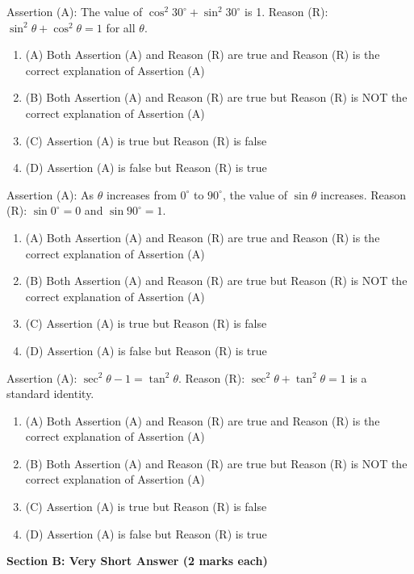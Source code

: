 \documentclass[12pt,a4paper]{exam}
\begin{document}
\begin{questions}
\question[1] Assertion (A): The value of $\cos^2 30^\circ + \sin^2 30^\circ$ is 1. Reason (R): $\sin^2 \theta + \cos^2 \theta = 1$ for all $\theta$.
\begin{enumerate}[label=(\Alph*)]
  \item (A) Both Assertion (A) and Reason (R) are true and Reason (R) is the correct explanation of Assertion (A)
  \item (B) Both Assertion (A) and Reason (R) are true but Reason (R) is NOT the correct explanation of Assertion (A)
  \item (C) Assertion (A) is true but Reason (R) is false
  \item (D) Assertion (A) is false but Reason (R) is true
\end{enumerate}
\vspace{0.15cm}

\question[1] Assertion (A): As $\theta$ increases from $0^\circ$ to $90^\circ$, the value of $\sin \theta$ increases. Reason (R): $\sin 0^\circ = 0$ and $\sin 90^\circ = 1$.
\begin{enumerate}[label=(\Alph*)]
  \item (A) Both Assertion (A) and Reason (R) are true and Reason (R) is the correct explanation of Assertion (A)
  \item (B) Both Assertion (A) and Reason (R) are true but Reason (R) is NOT the correct explanation of Assertion (A)
  \item (C) Assertion (A) is true but Reason (R) is false
  \item (D) Assertion (A) is false but Reason (R) is true
\end{enumerate}
\vspace{0.15cm}

\question[1] Assertion (A): $\sec^2 \theta - 1 = \tan^2 \theta$. Reason (R): $\sec^2 \theta + \tan^2 \theta = 1$ is a standard identity.
\begin{enumerate}[label=(\Alph*)]
  \item (A) Both Assertion (A) and Reason (R) are true and Reason (R) is the correct explanation of Assertion (A)
  \item (B) Both Assertion (A) and Reason (R) are true but Reason (R) is NOT the correct explanation of Assertion (A)
  \item (C) Assertion (A) is true but Reason (R) is false
  \item (D) Assertion (A) is false but Reason (R) is true
\end{enumerate}
\vspace{0.15cm}

\end{questions}
\bigskip
\noindent\textbf{\large Section B: Very Short Answer (2 marks each)}
\end{document}
